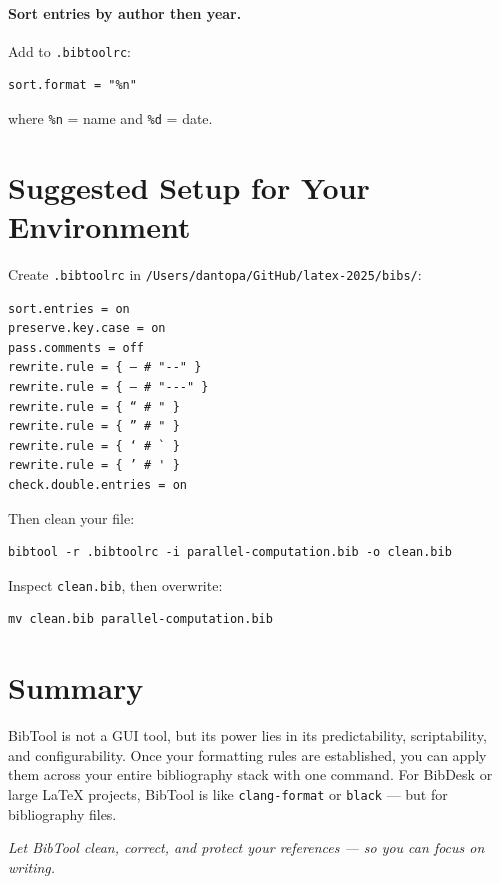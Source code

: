 \documentclass[12pt]{article}
\begin{document}
\paragraph{Sort entries by author then year.} Add to \texttt{.bibtoolrc}:
\begin{verbatim}
sort.format = "%n"
\end{verbatim}
where \texttt{\%n} = name and \texttt{\%d} = date.

\section{Suggested Setup for Your Environment}

Create \texttt{.bibtoolrc} in \texttt{/Users/dantopa/GitHub/latex-2025/bibs/}:
\begin{Verbatim}
sort.entries = on
preserve.key.case = on
pass.comments = off
rewrite.rule = { – # "--" }
rewrite.rule = { — # "---" }
rewrite.rule = { “ # " }
rewrite.rule = { ” # " }
rewrite.rule = { ‘ # ` }
rewrite.rule = { ’ # ' }
check.double.entries = on
\end{Verbatim}

Then clean your file:
\begin{verbatim}
bibtool -r .bibtoolrc -i parallel-computation.bib -o clean.bib
\end{verbatim}
Inspect \texttt{clean.bib}, then overwrite:
\begin{verbatim}
mv clean.bib parallel-computation.bib
\end{verbatim}

\section{Summary}

BibTool is not a GUI tool, but its power lies in its predictability, scriptability, and configurability. Once your formatting rules are established, you can apply them across your entire bibliography stack with one command. For BibDesk or large \LaTeX{} projects, BibTool is like \texttt{clang-format} or \texttt{black} --- but for bibliography files.

\emph{Let BibTool clean, correct, and protect your references --- so you can focus on writing.}
\end{document}
